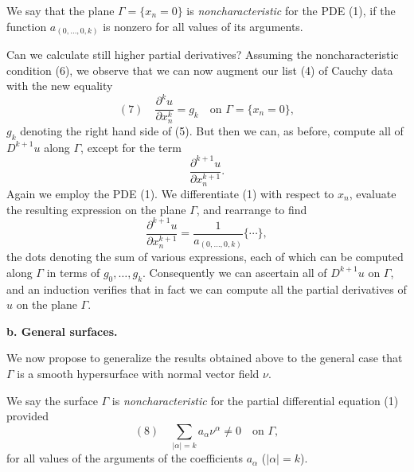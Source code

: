 \begin{definition}
\label{def:noncharacteristic-plane-flat}
We say that the plane $\Gamma = \{x_n = 0\}$ is \textit{noncharacteristic} for the PDE (1), if the function $a_{(0,\ldots,0,k)}$ is nonzero for all values of its arguments.
\end{definition}

Can we calculate still higher partial derivatives? Assuming the noncharacteristic condition (6), we observe that we can now augment our list (4) of Cauchy data with the new equality
$$(7) \quad \frac{\partial^k u}{\partial x_n^k} = g_k \quad \text{on } \Gamma = \{x_n = 0\},$$
$g_k$ denoting the right hand side of (5). But then we can, as before, compute all of $D^{k+1}u$ along $\Gamma$, except for the term
$$\frac{\partial^{k+1}u}{\partial x_n^{k+1}}.$$
Again we employ the PDE (1). We differentiate (1) with respect to $x_n$, evaluate the resulting expression on the plane $\Gamma$, and rearrange to find
$$\frac{\partial^{k+1}u}{\partial x_n^{k+1}} = \frac{1}{a_{(0,\ldots,0,k)}}\{\cdots\},$$
the dots denoting the sum of various expressions, each of which can be computed along $\Gamma$ in terms of $g_0,\ldots,g_k$. Consequently we can ascertain all of $D^{k+1}u$ on $\Gamma$, and an induction verifies that in fact we can compute all the partial derivatives of $u$ on the plane $\Gamma$.

\textbf{b. General surfaces.}

We now propose to generalize the results obtained above to the general case that $\Gamma$ is a smooth hypersurface with normal vector field $\nu$.

\begin{definition}
\label{def:noncharacteristic-surface}
We say the surface $\Gamma$ is \textit{noncharacteristic} for the partial differential equation (1) provided
$$(8) \quad \sum_{|\alpha|=k} a_\alpha \nu^\alpha \ne 0 \quad \text{on } \Gamma,$$
for all values of the arguments of the coefficients $a_\alpha$ ($|\alpha| = k$).
\end{definition}

